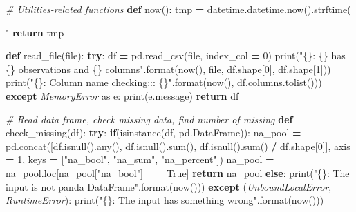 \documentclass[]{book}
\newenvironment{Shaded}{\begin{snugshade}}{\end{snugshade}}
\newcommand{\KeywordTok}[1]{\textcolor[rgb]{0.13,0.29,0.53}{\textbf{#1}}}
\newcommand{\DecValTok}[1]{\textcolor[rgb]{0.00,0.00,0.81}{#1}}
\newcommand{\SpecialCharTok}[1]{\textcolor[rgb]{0.00,0.00,0.00}{#1}}
\newcommand{\StringTok}[1]{\textcolor[rgb]{0.31,0.60,0.02}{#1}}
\newcommand{\ImportTok}[1]{#1}
\newcommand{\CommentTok}[1]{\textcolor[rgb]{0.56,0.35,0.01}{\textit{#1}}}
\newcommand{\VariableTok}[1]{\textcolor[rgb]{0.00,0.00,0.00}{#1}}
\newcommand{\ControlFlowTok}[1]{\textcolor[rgb]{0.13,0.29,0.53}{\textbf{#1}}}
\newcommand{\OperatorTok}[1]{\textcolor[rgb]{0.81,0.36,0.00}{\textbf{#1}}}
\newcommand{\BuiltInTok}[1]{#1}
\newcommand{\PreprocessorTok}[1]{\textcolor[rgb]{0.56,0.35,0.01}{\textit{#1}}}
\newcommand{\NormalTok}[1]{#1}
\begin{document}
\begin{Shaded}
\begin{Highlighting}[]
\CommentTok{# Utilities-related functions}
\KeywordTok{def}\NormalTok{ now():}
\NormalTok{    tmp }\OperatorTok{=}\NormalTok{ datetime.datetime.now().strftime(}\StringTok{"%Y-%m-}\SpecialCharTok{%d}\StringTok{ %H:%M:%S"}\NormalTok{)}
    \ControlFlowTok{return}\NormalTok{ tmp}

\KeywordTok{def}\NormalTok{ read_file(}\BuiltInTok{file}\NormalTok{):}
    \ControlFlowTok{try}\NormalTok{:}
\NormalTok{        df }\OperatorTok{=}\NormalTok{ pd.read_csv(}\BuiltInTok{file}\NormalTok{, index_col }\OperatorTok{=} \DecValTok{0}\NormalTok{)}
        \BuiltInTok{print}\NormalTok{(}\StringTok{"}\SpecialCharTok{\{\}}\StringTok{: }\SpecialCharTok{\{\}}\StringTok{ has }\SpecialCharTok{\{\}}\StringTok{ observations and }\SpecialCharTok{\{\}}\StringTok{ columns"}\NormalTok{.}\BuiltInTok{format}\NormalTok{(now(), }\BuiltInTok{file}\NormalTok{, df.shape[}\DecValTok{0}\NormalTok{], df.shape[}\DecValTok{1}\NormalTok{]))}
        \BuiltInTok{print}\NormalTok{(}\StringTok{"}\SpecialCharTok{\{\}}\StringTok{: Column name checking::: }\SpecialCharTok{\{\}}\StringTok{"}\NormalTok{.}\BuiltInTok{format}\NormalTok{(now(), df.columns.tolist()))}
    \ControlFlowTok{except} \PreprocessorTok{MemoryError} \ImportTok{as}\NormalTok{ e:}
        \BuiltInTok{print}\NormalTok{(e.message)}
    \ControlFlowTok{return}\NormalTok{ df}

\CommentTok{# Read data frame, check missing data, find number of missing}
\KeywordTok{def}\NormalTok{ check_missing(df):}
    \ControlFlowTok{try}\NormalTok{:}
        \ControlFlowTok{if}\NormalTok{(}\BuiltInTok{isinstance}\NormalTok{(df, pd.DataFrame)):}
\NormalTok{            na_pool }\OperatorTok{=}\NormalTok{ pd.concat([df.isnull().}\BuiltInTok{any}\NormalTok{(), df.isnull().}\BuiltInTok{sum}\NormalTok{(), df.isnull().}\BuiltInTok{sum}\NormalTok{() }\OperatorTok{/}\NormalTok{ df.shape[}\DecValTok{0}\NormalTok{]], axis }\OperatorTok{=} \DecValTok{1}\NormalTok{, keys }\OperatorTok{=}\NormalTok{ [}\StringTok{"na_bool"}\NormalTok{, }\StringTok{"na_sum"}\NormalTok{, }\StringTok{"na_percent"}\NormalTok{])}
\NormalTok{            na_pool }\OperatorTok{=}\NormalTok{ na_pool.loc[na_pool[}\StringTok{"na_bool"}\NormalTok{] }\OperatorTok{==}  \VariableTok{True}\NormalTok{]}
            \ControlFlowTok{return}\NormalTok{ na_pool}
        \ControlFlowTok{else}\NormalTok{:}
            \BuiltInTok{print}\NormalTok{(}\StringTok{"}\SpecialCharTok{\{\}}\StringTok{: The input is not panda DataFrame"}\NormalTok{.}\BuiltInTok{format}\NormalTok{(now()))}
    \ControlFlowTok{except}\NormalTok{ (}\PreprocessorTok{UnboundLocalError}\NormalTok{, }\PreprocessorTok{RuntimeError}\NormalTok{):}
        \BuiltInTok{print}\NormalTok{(}\StringTok{"}\SpecialCharTok{\{\}}\StringTok{: The input has something wrong"}\NormalTok{.}\BuiltInTok{format}\NormalTok{(now()))}

}
\end{Highlighting}
\end{Shaded}
\end{document}
